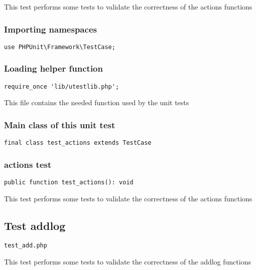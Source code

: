\documentclass[a4paper]{article}
\begin{document}
This test performs some tests to validate the correctness
of the actions functions

\hypertarget{toc15}{}
\subsubsection{Importing namespaces}

\begin{lstlisting}
use PHPUnit\Framework\TestCase;
\end{lstlisting}

\hypertarget{toc16}{}
\subsubsection{Loading helper function}

\begin{lstlisting}
require_once 'lib/utestlib.php';
\end{lstlisting}

This file contains the needed function used by the unit tests

\hypertarget{toc17}{}
\subsubsection{Main class of this unit test}

\begin{lstlisting}
final class test_actions extends TestCase
\end{lstlisting}

\hypertarget{toc18}{}
\subsubsection{actions test}

\begin{lstlisting}
public function test_actions(): void
\end{lstlisting}

This test performs some tests to validate the correctness
of the actions functions

\hypertarget{toc19}{}
\subsection{Test addlog}

\begin{lstlisting}
test_add.php
\end{lstlisting}

This test performs some tests to validate the correctness
of the addlog functions
\end{document}
